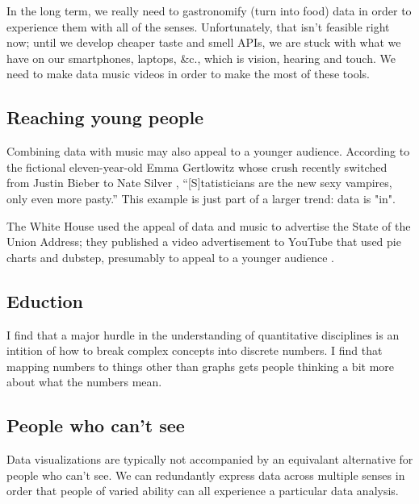 \documentclass{acm_proc_article-sp}
\begin{document}
In the long term, we really need to gastronomify (turn into food)
data in order to experience them with all of the senses.
Unfortunately, that isn't feasible right now;
until we develop cheaper taste and smell APIs, we are stuck with what we have
on our smartphones, laptops, \&c., which is vision, hearing and touch. We need
to make data music videos in order to make the most of these tools.

\subsection{Reaching young people}
Combining data with music may also appeal to a younger audience.
According to the fictional eleven-year-old Emma Gertlowitz whose crush
recently switched from Justin Bieber to Nate Silver \cite{emma},
``[S]tatisticians are the new sexy vampires, only even more pasty.''
This example is just part of a larger trend: data is "in".

The White House used the appeal of data and music to advertise the State
of the Union Address; they published a video advertisement to YouTube that
used pie charts and dubstep, presumably to appeal to a younger audience \cite{whitehouse}.

\subsection{Eduction}
I find that a major hurdle in the understanding of quantitative disciplines
is an intition of how to break complex concepts into discrete numbers.
I find that mapping numbers to things other than graphs gets people thinking
a bit more about what the numbers mean.

\subsection{People who can't see}
Data visualizations are typically not accompanied by an equivalant
alternative for people who can't see. We can redundantly express data
across multiple senses in order that people of varied ability can all
experience a particular data analysis.



\balancecolumns
\end{document}
